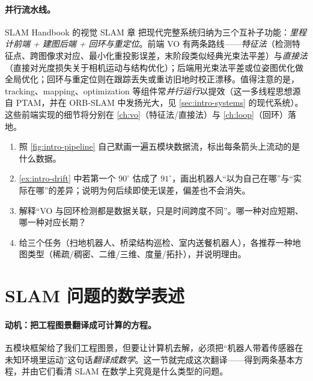 \paragraph{并行流水线。}
SLAM Handbook 的视觉 SLAM 章\cite{carlone2026handbook} 把现代完整系统归纳为三个互补子功能：\emph{里程计前端 + 建图后端 + 回环与重定位}。前端 VO 有两条路线——\emph{特征法}（检测特征点、跨图像求对应、最小化重投影误差，末阶段类似经典光束法平差）与\emph{直接法}（直接对光度损失关于相机运动与结构优化）；后端用光束法平差或位姿图优化做全局优化；回环与重定位则在跟踪丢失或重访旧地时校正漂移。值得注意的是，tracking、mapping、optimization 等组件常\emph{并行运行}以提效（这一多线程思想源自 PTAM，并在 ORB-SLAM 中发扬光大，见 \cref{sec:intro-systems} 的现代系统）。这些前端实现的细节将分别在 \cref{ch:vo}（特征法/直接法）与 \cref{ch:loop}（回环）落地。

\begin{practice}
\begin{enumerate}
  \item 照 \cref{fig:intro-pipeline} 自己默画一遍五模块数据流，标出每条箭头上流动的是什么数据。
  \item \cref{ex:intro-drift} 中若第一个 $90^\circ$ 估成了 $91^\circ$，画出机器人“以为自己在哪”与“实际在哪”的差异；说明为何后续即使无误差，偏差也不会消失。
  \item 解释“VO 与回环检测都是数据关联，只是时间跨度不同”。哪一种对应短期、哪一种对应长期？
  \item 给三个任务（扫地机器人、桥梁结构巡检、室内送餐机器人），各推荐一种地图类型（稀疏/稠密、二维/三维、度量/拓扑），并说明理由。
\end{enumerate}
\end{practice}

\section{SLAM 问题的数学表述}
\label{sec:intro-math}

\paragraph{动机：把工程图景翻译成可计算的方程。}
五模块框架给了我们工程图景，但要让计算机去解，必须把“机器人带着传感器在未知环境里运动”这句话\emph{翻译成数学}。这一节就完成这次翻译——得到两条基本方程，并由它们看清 SLAM 在数学上究竟是什么类型的问题。

